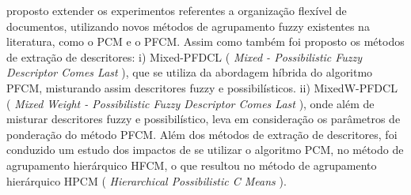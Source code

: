 proposto extender os experimentos referentes a organização flexível de documentos, utilizando
novos métodos de agrupamento fuzzy existentes na literatura, como o PCM e o PFCM. Assim como também 
foi proposto os métodos de extração de descritores: i) Mixed-PFDCL 
({ \it Mixed - Possibilistic Fuzzy Descriptor Comes Last\/ }), que se utiliza da abordagem híbrida do 
algoritmo PFCM, misturando assim descritores fuzzy e possibilísticos. ii) MixedW-PFDCL
({ \it Mixed Weight - Possibilistic Fuzzy Descriptor Comes Last\/ }), 
onde além de misturar descritores 
fuzzy e possibilístico, leva em consideração os parâmetros de ponderação do método PFCM.
Além dos métodos de extração de descritores, foi conduzido um estudo dos impactos de se utilizar o 
algoritmo PCM, no método de agrupamento hierárquico HFCM, o que resultou no método de 
agrupamento hierárquico HPCM ({ \it Hierarchical Possibilistic C Means\/ }).
